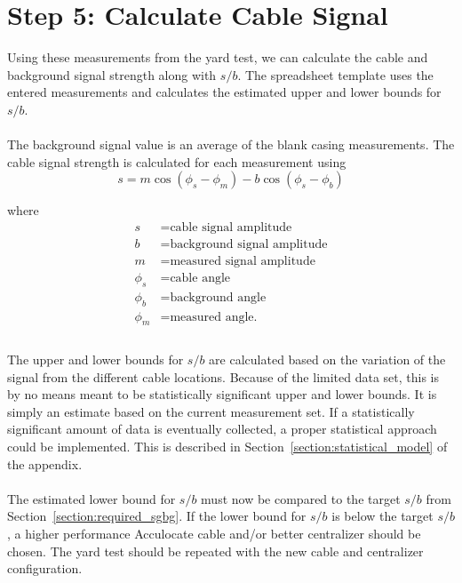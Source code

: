\documentclass[paper=a4, fontsize=11pt]{scrartcl}
\numberwithin{equation}{section}		%
\numberwithin{figure}{section}			%
\numberwithin{table}{section}				%
\begin{document}
\section{Step 5: Calculate Cable Signal}\label{section:step_5}
Using these measurements from the yard test, we can calculate the cable and background signal strength along with $s/b$.  The spreadsheet template uses the entered measurements and calculates the estimated upper and lower bounds for $s/b$. 

\paragraph{}
The background signal value is an average of the blank casing measurements.  The cable signal strength is calculated for each measurement using
\begin{equation}
    s = m \cos\left(\phi_s-\phi_m\right) - b\cos\left( \phi_s-\phi_b\right)
\end{equation}

where 
\begin{align*}
    s &= \text{cable signal amplitude}\\
    b &= \text{background signal amplitude}\\
    m &= \text{measured signal amplitude}\\
    \phi_s &= \text{cable angle}\\
    \phi_b &= \text{background angle}\\
    \phi_m &= \text{measured angle.}\\
\end{align*}

\paragraph{}
The upper and lower bounds for $s/b$ are calculated based on the variation of the signal from the different cable locations.  Because of the limited data set, this is by no means meant to be statistically significant upper and lower bounds.  It is simply an estimate based on the current measurement set.  If a statistically significant amount of data is eventually collected, a proper statistical approach could be implemented.  This is described in Section~\ref{section:statistical_model} of the appendix.

\paragraph{}
The estimated lower bound for $s/b$ must now be compared to the target $s/b$ from Section~\ref{section:required_sgbg}.  If the lower bound for $s/b$ is below the target $s/b$, a higher performance Acculocate cable and/or better centralizer should be chosen.  The yard test should be repeated with the new cable and centralizer configuration. 
\end{document}
